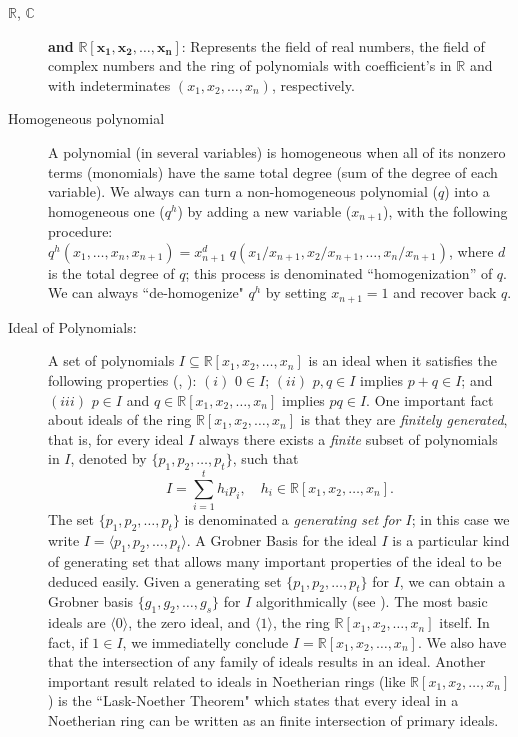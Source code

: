 \documentclass{article}
\begin{document}
\begin{description}

\item[$\pmb{\mathbb R}$, $\pmb{\mathbb C}$] {\bf and} $\pmb{\mathbb R[x_1, x_2, \ldots, x_n]}$:
Represents the field of real numbers, the
field of complex numbers and the ring of polynomials with coefficient's in
$\mathbb R$ and with indeterminates 
$(x_1, x_2, \ldots, x_n)$, respectively.

\item [Homogeneous polynomial] A polynomial (in several variables) is
homogeneous when all of its nonzero terms (monomials)
have the same total degree (sum of the degree of each variable). We always
can turn a non-homogeneous polynomial ($q$) into a homogeneous one ($q^h$)
by adding a new variable ($x_{n+1}$), with the following procedure:
$q^h(x_1, \ldots, x_n,x_{n+1}) = x_{n+1}^{d}\;q(x_1/x_{n+1}, x_2/x_{n+1}, 
\ldots, x_n/x_{n+1})$, where $d$ is the total degree of $q$; this process is
denominated ``homogenization'' of $q$.   We can always ``de-homogenize"
$q^h$ by setting $x_{n+1}=1$ and recover back $q$.

\item[Ideal of Polynomials:] A set of polynomials 
$I \subseteq  \mathbb R[x_1, x_2, \ldots, x_n]$ is an ideal when
it satisfies the following properties (\cite{clo}, \cite{am}): 
$(i)$ $0 \in I$; 
$(ii)$ $p,q \in I$ implies $p+q \in I$; and 
$(iii)$ $p\in I$ and $q\in \mathbb R[x_1,x_2,\ldots, x_n]$ implies $pq\in I$.
One important fact about ideals of the ring $\mathbb R[x_1,x_2,\ldots,x_n]$ is that they
are {\em finitely generated}, that is, for every ideal $I$ always there exists a {\em finite} subset of 
polynomials in $I$, denoted by $\{p_1,p_2,\ldots, p_t\}$, such that 
\[
I = \sum_{i=1}^{t}h_ip_i, \quad h_i \in \mathbb R[x_1, x_2, \ldots, x_n].
\] 
The set $\{p_1, p_2, \ldots, p_t\}$ is denominated a {\em generating set for $I$}; in this case
we write $I=\langle p_1, p_2, \ldots, p_t\rangle$. A Grobner Basis for the ideal 
$I$ is a particular kind of generating set that allows many important 
properties of the ideal to be deduced easily. Given a generating 
set $\{p_1, p_2, \ldots, p_t\}$ for $I$, we can obtain a Grobner basis
$\{g_1, g_2, \ldots, g_s\}$ for $I$ algorithmically (see \cite[Ch.~2]{clo}).
The most basic ideals are $\langle 0\rangle$, the zero ideal, and
$\langle 1\rangle$, the ring $\mathbb R[x_1,x_2,\ldots,x_n]$ itself. In fact, 
if $1\in I$, we immediatelly conclude $I= \mathbb R[x_1,x_2,\ldots,x_n]$.
We also have that the intersection of any family of ideals results in an ideal.
Another important result related to ideals in Noetherian rings (like
$\mathbb R[x_1,x_2,\ldots,x_n]$) is the ``Lask-Noether Theorem" which 
states that every ideal in a Noetherian ring can be written as an finite intersection
of primary ideals.


\end{description}
\end{document}
